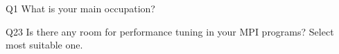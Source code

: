 \begin{description}%
\item{Q1} What is your main occupation?%
\item{Q23} Is there any room for performance tuning in your MPI programs? Select most suitable one.%
\end{description}%

